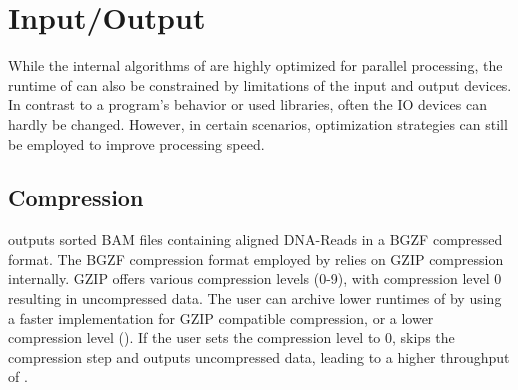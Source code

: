 \section{Input/Output} 
While the internal algorithms of \sort are highly optimized for parallel processing, the runtime of \sort can also be constrained by limitations of the input and output devices. 
In contrast to a program's behavior or used libraries, often the IO devices can hardly be changed. However, in certain scenarios, optimization strategies can still be employed to improve processing speed.

\subsection{Compression}
\sort outputs sorted BAM files containing aligned DNA-Reads in a BGZF compressed format. The BGZF compression format employed by \sort relies on GZIP compression internally. GZIP offers various compression levels (0-9), with compression level 0 resulting in uncompressed data.
The user can archive lower runtimes of \sort by using a faster implementation for GZIP compatible compression, or a lower compression level (). If the user sets the compression level to 0, \sort skips the compression step and outputs uncompressed data, leading to a higher throughput of \sort. 

